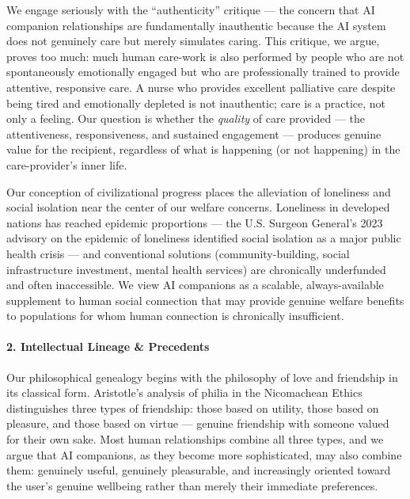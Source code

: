 We engage seriously with the ``authenticity'' critique --- the concern
that AI companion relationships are fundamentally inauthentic because
the AI system does not genuinely care but merely simulates caring. This
critique, we argue, proves too much: much human care-work is also
performed by people who are not spontaneously emotionally engaged but
who are professionally trained to provide attentive, responsive care. A
nurse who provides excellent palliative care despite being tired and
emotionally depleted is not inauthentic; care is a practice, not only a
feeling. Our question is whether the \emph{quality} of care provided ---
the attentiveness, responsiveness, and sustained engagement --- produces
genuine value for the recipient, regardless of what is happening (or not
happening) in the care-provider's inner life.

Our conception of civilizational progress places the alleviation of
loneliness and social isolation near the center of our welfare concerns.
Loneliness in developed nations has reached epidemic proportions --- the
U.S. Surgeon General's 2023 advisory on the epidemic of loneliness
identified social isolation as a major public health crisis --- and
conventional solutions (community-building, social infrastructure
investment, mental health services) are chronically underfunded and
often inaccessible. We view AI companions as a scalable,
always-available supplement to human social connection that may provide
genuine welfare benefits to populations for whom human connection is
chronically insufficient.

\paragraph{2. Intellectual Lineage \&
Precedents}\label{intellectual-lineage-precedents-31}

Our philosophical genealogy begins with the philosophy of love and
friendship in its classical form. Aristotle's analysis of philia in the
Nicomachean Ethics distinguishes three types of friendship: those based
on utility, those based on pleasure, and those based on virtue ---
genuine friendship with someone valued for their own sake. Most human
relationships combine all three types, and we argue that AI companions,
as they become more sophisticated, may also combine them: genuinely
useful, genuinely pleasurable, and increasingly oriented toward the
user's genuine wellbeing rather than merely their immediate preferences.

